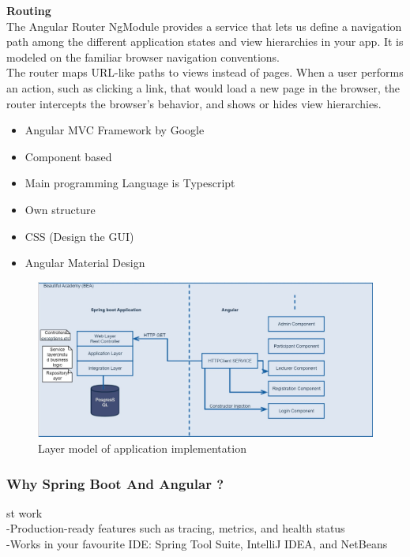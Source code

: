 \documentclass{scrartcl}
\begin{document}
\textbf{Routing}\\
The Angular Router NgModule provides a service that lets us define a navigation path among the different application states and view hierarchies in your app. It is modeled on the familiar browser navigation conventions.\\
The router maps URL-like paths to views instead of pages. When a user performs an action, such as clicking a link, that would load a new page in the browser, the router intercepts the browser's behavior, and shows or hides view hierarchies.\\




\begin{itemize}
	\item	Angular MVC Framework by Google
	\item	Component based
	\item	Main programming Language is Typescript
	\item	Own structure
	\item	CSS (Design the GUI)
	\item   Angular Material Design

\end{itemize}
\begin{figure}[H]
\centering
\includegraphics[width = 130mm]{layer.JPG}
\caption{Layer model of application implementation}
\label{layers}
\end{figure}

\subsubsection{Why Spring Boot And Angular ?}
st work\\
-Production-ready features such as tracing, metrics, and health status\\
-Works in your favourite IDE: Spring Tool Suite, IntelliJ IDEA, and NetBeans\\
\end{document}

